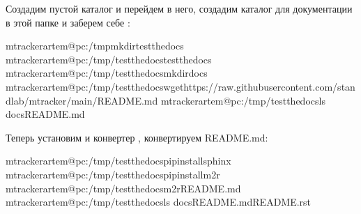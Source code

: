 \documentclass[letterpaper,10pt,russian]{sphinxmanual}
\begin{document}
\sphinxAtStartPar
{}

\sphinxAtStartPar
Создадим пустой каталог и перейдем в него, создадим каталог для документации в этой папке и заберем себе :

\begin{sphinxVerbatim}[commandchars=\\\{\}]
mtrackerartem@pc:\PYGZti{}/tmp\PYGZdl{}mkdirtest\PYGZus{}the\PYGZus{}docs
mtrackerartem@pc:\PYGZti{}/tmp/test\PYGZus{}the\PYGZus{}docs\PYGZdl{}test\PYGZus{}the\PYGZus{}docs
mtrackerartem@pc:\PYGZti{}/tmp/test\PYGZus{}the\PYGZus{}docs\PYGZdl{}mkdirdocs
mtrackerartem@pc:\PYGZti{}/tmp/test\PYGZus{}the\PYGZus{}docs\PYGZdl{}wgethttps://raw.githubusercontent.com/standlab/mtracker/main/README.md
mtrackerartem@pc:\PYGZti{}/tmp/test\PYGZus{}the\PYGZus{}docs\PYGZdl{}ls
docsREADME.md
\end{sphinxVerbatim}

\sphinxAtStartPar
Теперь установим  и конвертер , конвертируем README.md:

\begin{sphinxVerbatim}[commandchars=\\\{\}]
mtrackerartem@pc:\PYGZti{}/tmp/test\PYGZus{}the\PYGZus{}docs\PYGZdl{}pipinstallsphinx
mtrackerartem@pc:\PYGZti{}/tmp/test\PYGZus{}the\PYGZus{}docs\PYGZdl{}pipinstallm2r
mtrackerartem@pc:\PYGZti{}/tmp/test\PYGZus{}the\PYGZus{}docs\PYGZdl{}m2rREADME.md
mtrackerartem@pc:\PYGZti{}/tmp/test\PYGZus{}the\PYGZus{}docs\PYGZdl{}ls
docsREADME.mdREADME.rst
\end{sphinxVerbatim}

\sphinxAtStartPar
{}
\end{document}
